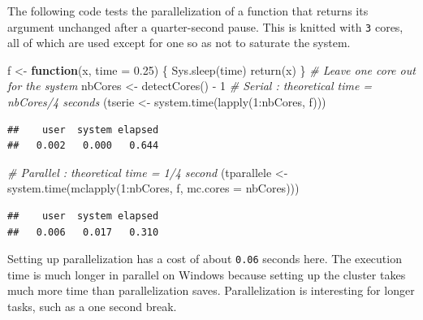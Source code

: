 \documentclass[
  12pt,
  american,
  a4paper,
  extrafontsizes,onecolumn,openright
  ]{memoir}
\newenvironment{Shaded}{\begin{snugshade}}{\end{snugshade}}
\newcommand{\AttributeTok}[1]{\textcolor[rgb]{0.77,0.63,0.00}{#1}}
\newcommand{\CommentTok}[1]{\textcolor[rgb]{0.56,0.35,0.01}{\textit{#1}}}
\newcommand{\ControlFlowTok}[1]{\textcolor[rgb]{0.13,0.29,0.53}{\textbf{#1}}}
\newcommand{\DecValTok}[1]{\textcolor[rgb]{0.00,0.00,0.81}{#1}}
\newcommand{\FloatTok}[1]{\textcolor[rgb]{0.00,0.00,0.81}{#1}}
\newcommand{\FunctionTok}[1]{\textcolor[rgb]{0.00,0.00,0.00}{#1}}
\newcommand{\NormalTok}[1]{#1}
\newcommand{\OtherTok}[1]{\textcolor[rgb]{0.56,0.35,0.01}{#1}}
\newcommand{\SpecialCharTok}[1]{\textcolor[rgb]{0.00,0.00,0.00}{#1}}
\begin{document}
\normalsize

The following code tests the parallelization of a function that returns its argument unchanged after a quarter-second pause.
This is knitted with \texttt{3} cores, all of which are used except for one so as not to saturate the system.

\scriptsize

\begin{Shaded}
\begin{Highlighting}[]
\NormalTok{f }\OtherTok{\textless{}{-}} \ControlFlowTok{function}\NormalTok{(x, }\AttributeTok{time =} \FloatTok{0.25}\NormalTok{) \{}
    \FunctionTok{Sys.sleep}\NormalTok{(time)}
    \FunctionTok{return}\NormalTok{(x)}
\NormalTok{\}}
\CommentTok{\# Leave one core out for the system}
\NormalTok{nbCores }\OtherTok{\textless{}{-}} \FunctionTok{detectCores}\NormalTok{() }\SpecialCharTok{{-}} \DecValTok{1}
\CommentTok{\# Serial : theoretical time = nbCores/4 seconds}
\NormalTok{(tserie }\OtherTok{\textless{}{-}} \FunctionTok{system.time}\NormalTok{(}\FunctionTok{lapply}\NormalTok{(}\DecValTok{1}\SpecialCharTok{:}\NormalTok{nbCores, f)))}
\end{Highlighting}
\end{Shaded}

\begin{verbatim}
##    user  system elapsed 
##   0.002   0.000   0.644
\end{verbatim}

\begin{Shaded}
\begin{Highlighting}[]
\CommentTok{\# Parallel : theoretical time = 1/4 second}
\NormalTok{(tparallele }\OtherTok{\textless{}{-}} \FunctionTok{system.time}\NormalTok{(}\FunctionTok{mclapply}\NormalTok{(}\DecValTok{1}\SpecialCharTok{:}\NormalTok{nbCores, f, }\AttributeTok{mc.cores =}\NormalTok{ nbCores)))}
\end{Highlighting}
\end{Shaded}

\begin{verbatim}
##    user  system elapsed 
##   0.006   0.017   0.310
\end{verbatim}

\normalsize

Setting up parallelization has a cost of about \texttt{0.06} seconds here.
The execution time is much longer in parallel on Windows because setting up the cluster takes much more time than parallelization saves.
Parallelization is interesting for longer tasks, such as a one second break.
\end{document}

